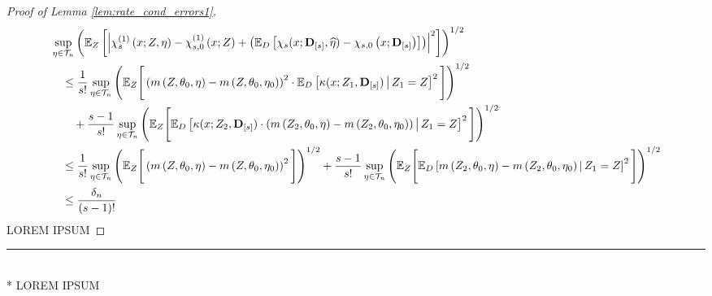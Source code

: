 \begin{proof}[Proof of Lemma \ref{lem:rate_cond_errors1}]
    \begin{equation}
        \begin{aligned}
            & \sup_{\eta \in \mathcal{T}_{n}}\left(
                \mathbb{E}_{Z}\left[
                    \left|\chi_{s}^{(1)}\left(x; Z, \eta\right) 
                    - \chi_{s,0}^{(1)}\left(x; Z\right)
                    + \left(\mathbb{E}_{D}\left[\chi_{s}(x; \mathbf{D}_{[s]}, \widehat{\eta}) - \chi_{s,0}\left(x; \mathbf{D}_{[s]}\right)\right]\right)\right|^2
                \right]
            \right)^{1 / 2} \\
            & \quad \leq
             \frac{1}{s!}\sup_{\eta \in \mathcal{T}_{n}}\left(\mathbb{E}_{Z}\Bigg[\left(m\left(Z, \theta_{0}, \eta\right) - m\left(Z, \theta_{0}, \eta_{0}\right)\right)^{2} \cdot \mathbb{E}_{D}\left[\kappa(x; Z_{1}, \mathbf{D}_{[s]}) \, \middle| \, Z_1 = Z \right]^{2}\Bigg]\right)^{1/2}\\
            & \quad \quad + \frac{s-1}{s!} \sup_{\eta \in \mathcal{T}_{n}} \left(\mathbb{E}_{Z}\Bigg[\mathbb{E}_{D}\left[\kappa(x; Z_{2}, \mathbf{D}_{[s]})\cdot \left(m\left(Z_{2}, \theta_{0}, \eta\right)
            - m\left(Z_{2}, \theta_{0}, \eta_{0}\right)\right) \, \middle| \, Z_1 = Z \right]^{2}\Bigg]\right)^{1/2} \\
            & \quad \leq 
            \frac{1}{s!}\sup_{\eta \in \mathcal{T}_{n}}\left(\mathbb{E}_{Z}\Bigg[\left(m\left(Z, \theta_{0}, \eta\right) - m\left(Z, \theta_{0}, \eta_{0}\right)\right)^{2}\Bigg]\right)^{1/2}
            + \frac{s-1}{s!} \sup_{\eta \in \mathcal{T}_{n}} \left(\mathbb{E}_{Z}\Bigg[\mathbb{E}_{D}\left[m\left(Z_{2}, \theta_{0}, \eta\right)
            - m\left(Z_{2}, \theta_{0}, \eta_{0}\right) \, \middle| \, Z_1 = Z \right]^{2}\Bigg]\right)^{1/2} \\
            & \quad \leq \frac{\delta_{n}}{(s-1)!}
        \end{aligned}
    \end{equation}
    {\color{red} LOREM IPSUM}
\end{proof}

\hrule

\begin{lem}[]\label{lem:rate_cond_errors2}\mbox{}\\*
    {\color{red} LOREM IPSUM}
\end{lem}

